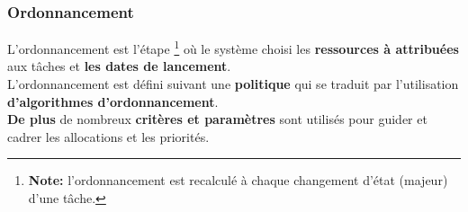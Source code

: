 \documentclass{beamer}
\begin{document}

\begin{frame}
	\frametitle{Ordonnancement}
	
	L'ordonnancement est l'étape \footnote{{\bf Note:} l'ordonnancement est recalculé à chaque changement d'état (majeur) d'une tâche.}
où le système choisi les {\bf ressources à attribuées} aux tâches et {\bf les dates de lancement}.
\\[0.4cm]
	L'ordonnancement est défini suivant une {\bf politique} qui se traduit par l'utilisation {\bf d'algorithmes d'ordonnancement}.
\\[0.4cm]
	{\bf De plus} de nombreux {\bf critères et paramètres} sont utilisés pour guider et cadrer les allocations et les priorités.
 

\end{frame}


\end{document}
